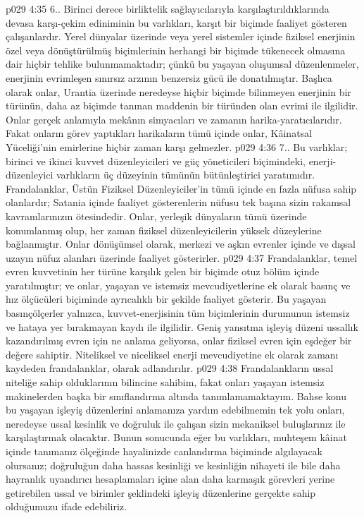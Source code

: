 \vs p029 4:35 6.\bibnobreakspace {}. Birinci derece birliktelik sağlayıcılarıyla karşılaştırıldıklarında devasa karşı\hyp{}çekim ediniminin bu varlıkları, karşıt bir biçimde faaliyet gösteren çalışanlardır. Yerel dünyalar üzerinde veya yerel sistemler içinde fiziksel enerjinin özel veya dönüştürülmüş biçimlerinin herhangi bir biçimde tükenecek olmasına dair hiçbir tehlike bulunmamaktadır; çünkü bu yaşayan oluşumsal düzenlenmeler, enerjinin evrimleşen sınırsız arzının benzersiz gücü ile donatılmıştır. Başlıca olarak onlar, Urantia üzerinde neredeyse hiçbir biçimde bilinmeyen enerjinin bir türünün, daha az biçimde tanınan maddenin bir türünden olan evrimi ile ilgilidir. Onlar gerçek anlamıyla mekânın simyacıları ve zamanın harika\hyp{}yaratıcılarıdır. Fakat onların görev yaptıkları harikaların tümü içinde onlar, Kâinatsal Yüceliği’nin emirlerine hiçbir zaman karşı gelmezler.
\vs p029 4:36 7.\bibnobreakspace {}. Bu varlıklar; birinci ve ikinci kuvvet düzenleyicileri ve güç yöneticileri biçimindeki, enerji\hyp{}düzenleyici varlıkların üç düzeyinin tümünün bütünleştirici yaratımıdır. Frandalanklar, Üstün Fiziksel Düzenleyiciler’in tümü içinde en fazla nüfusa sahip olanlardır; Satania içinde faaliyet gösterenlerin nüfusu tek başına sizin rakamsal kavramlarınızın ötesindedir. Onlar, yerleşik dünyaların tümü üzerinde konumlanmış olup, her zaman fiziksel düzenleyicilerin yüksek düzeylerine bağlanmıştır. Onlar dönüşümsel olarak, merkezi ve aşkın evrenler içinde ve dışsal uzayın nüfuz alanları üzerinde faaliyet gösterirler.
\vs p029 4:37 Frandalanklar, temel evren kuvvetinin her türüne karşılık gelen bir biçimde otuz bölüm içinde yaratılmıştır; ve onlar, yaşayan ve istemsiz mevcudiyetlerine ek olarak basınç ve hız ölçücüleri biçiminde ayrıcalıklı bir şekilde faaliyet gösterir. Bu yaşayan basınçölçerler yalnızca, kuvvet\hyp{}enerjisinin tüm biçimlerinin durumunun istemsiz ve hataya yer bırakmayan kaydı ile ilgilidir. Geniş yansıtma işleyiş düzeni ussallık kazandırılmış evren için ne anlama geliyorsa, onlar fiziksel evren için eşdeğer bir değere sahiptir. Niteliksel ve niceliksel enerji mevcudiyetine ek olarak zamanı kaydeden frandalanklar,  olarak adlandırılır.
\vs p029 4:38 Frandalankların ussal niteliğe sahip olduklarının bilincine sahibim, fakat onları yaşayan istemsiz makinelerden başka bir sınıflandırma altında tanımlamamaktayım. Bahse konu bu yaşayan işleyiş düzenlerini anlamanıza yardım edebilmemin tek yolu onları, neredeyse ussal kesinlik ve doğruluk ile çalışan sizin mekaniksel buluşlarınız ile karşılaştırmak olacaktır. Bunun sonucunda eğer bu varlıkları, muhteşem kâinat içinde tanımanız ölçeğinde hayalinizde canlandırma biçiminde algılayacak olursanız; doğruluğun daha hassas kesinliği ve kesinliğin nihayeti ile bile daha hayranlık uyandırıcı hesaplamaları içine alan daha karmaşık görevleri yerine getirebilen ussal ve  birimler şeklindeki işleyiş düzenlerine gerçekte sahip olduğumuzu ifade edebiliriz.
